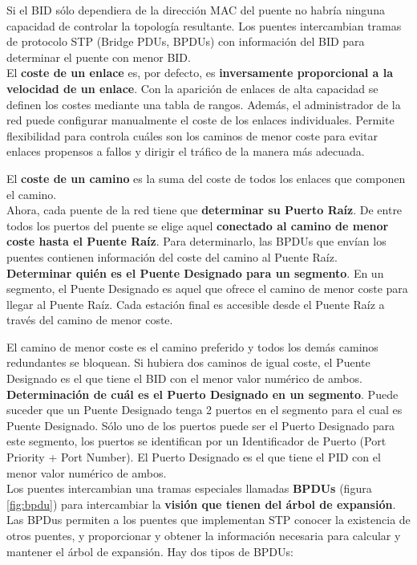 \documentclass[10pt,portrait, twocolumn]{article}
\begin{document}
\quad Si el BID sólo dependiera de la dirección MAC del puente no habría ninguna capacidad de controlar la topología resultante. Los puentes intercambian tramas de protocolo STP (Bridge PDUs, BPDUs) con información del BID para determinar el puente con menor BID.\\

El \textbf{coste de un enlace} es, por defecto, es \textbf{inversamente proporcional a la velocidad de un enlace}. Con la aparición de enlaces de alta capacidad se definen los costes mediante una tabla de rangos. Además, el administrador de la red puede configurar manualmente el coste de los enlaces individuales. Permite flexibilidad para controla cuáles son los caminos de menor coste para evitar enlaces propensos a fallos y dirigir el tráfico de la manera más adecuada.

\quad El \textbf{coste de un camino} es la suma del coste de todos los enlaces que componen el camino.\\

Ahora, cada puente de la red tiene que \textbf{determinar su Puerto Raíz}. De entre todos los puertos del puente se elige aquel \textbf{conectado al camino de menor coste hasta el Puente Raíz}. Para determinarlo, las BPDUs que envían los puentes contienen información del coste del camino al Puente Raíz.\\

\textbf{Determinar quién es el Puente Designado para un segmento}. En un segmento, el Puente Designado es aquel que ofrece el camino de menor coste para llegar al Puente Raíz. Cada estación final es accesible desde el Puente Raíz a través del camino de menor coste. 

\quad El camino de menor coste es el camino preferido y todos los demás caminos redundantes se bloquean. Si hubiera dos caminos de igual coste, el Puente Designado es el que tiene el BID con el menor valor numérico de ambos.\\

\textbf{Determinación de cuál es el Puerto Designado en un segmento}. Puede suceder que un Puente Designado tenga 2 puertos en el segmento para el cual es Puente Designado. Sólo uno de los puertos puede ser el Puerto Designado para este segmento, los puertos se identifican por un Identificador de Puerto (Port Priority + Port Number). El Puerto Designado es el que tiene el PID con el menor valor numérico de ambos.\\

Los puentes intercambian una tramas especiales llamadas \textbf{BPDUs} (figura \ref{fig:bpdu}) para intercambiar la \textbf{visión que tienen del árbol de expansión}. Las BPDus permiten a los puentes que implementan STP conocer la existencia de otros puentes, y proporcionar y obtener la información necesaria para calcular y mantener el árbol de expansión. Hay dos tipos de BPDUs:
\end{document}
